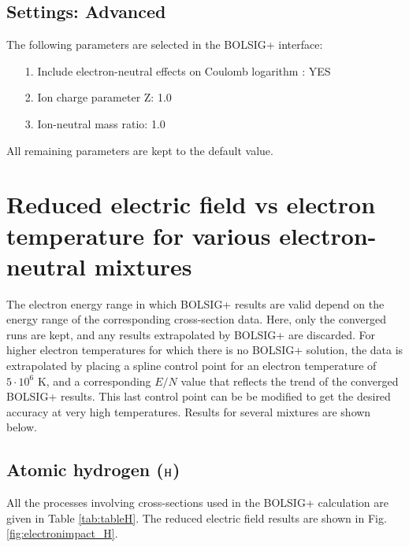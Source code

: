 \subsection{Settings: Advanced}

The following parameters are selected in the BOLSIG+ interface:

\begin{itemize}
\item[1.]{Include electron-neutral effects on Coulomb logarithm : YES}
\item[2.]{Ion charge parameter Z: 1.0}
\item[3.]{Ion-neutral mass ratio: 1.0}
\end{itemize}
All remaining parameters are kept to the default value.

\section{Reduced electric field vs electron temperature for various electron-neutral mixtures}

The electron energy range in which BOLSIG+ results are valid depend on the energy range of the corresponding cross-section data. Here, only the converged runs are kept, and any results extrapolated by BOLSIG+ are discarded. For higher electron temperatures for which there is no BOLSIG+ solution, the data is extrapolated by placing a spline control point for an electron temperature of $5\cdot10^6$ K, and a corresponding $E/N$ value that reflects the trend of the converged BOLSIG+ results. This last control point can be be modified to get the desired accuracy at very high temperatures. Results for several mixtures are shown below.

%
\subsection{Atomic hydrogen ($\rm H$)}

All the processes involving cross-sections used in the BOLSIG+ calculation are given in Table \ref{tab:tableH}. The reduced electric field results are shown in Fig. \ref{fig:electronimpact_H}.


